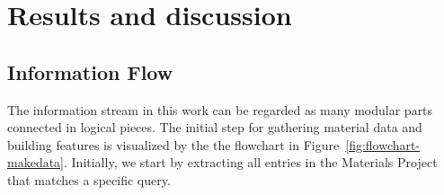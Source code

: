 \documentclass[superscriptaddress,unsortedaddress,
 amsmath,amssymb,
 aps,
]{revtex4-2}
\begin{document}




\section*{Results and discussion}

\subsection*{Information Flow}  %

The information stream in this work can be regarded as many
modular parts connected in logical pieces. The initial step for
gathering material data and building features is visualized by the
the flowchart in Figure~\ref{fig:flowchart-makedata}. 
Initially, we start by extracting all entries in
the Materials Project that matches a specific query. 




\end{document}
